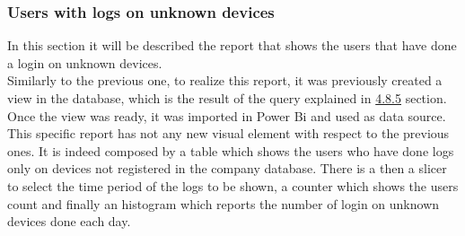 \documentclass[12pt, a4paper, oneside]{article}
\begin{document}
\subsubsection{Users with logs on unknown devices}
In this section it will be described the report that shows the users that have done a login on unknown devices. \\
Similarly to the previous one, to realize this report, it was previously created a view in the database, which is the result of the query explained in \hyperref[subsubsec:unknown]{4.8.5} section.\\
Once the view was ready, it was imported in Power Bi and used as data source. This specific report has not any new visual element with respect to the previous ones. It is indeed composed by a table which
shows the users who have done logs only on devices not registered in the company database.
There is a then a slicer to select the time period of the logs to be shown, a counter which shows the users count and finally an histogram which reports the number of login on unknown devices done each day.
\end{document}
